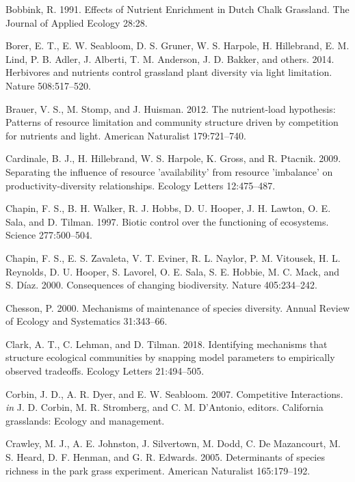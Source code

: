 \documentclass[twoside,12pt,final]{ucthesis-CA2012}
\begin{document}
\begin{ucmainmatter}
\leavevmode\hypertarget{ref-Bobbink1991}{}%
Bobbink, R. 1991. Effects of Nutrient Enrichment in Dutch Chalk Grassland. The Journal of Applied Ecology 28:28.

\leavevmode\hypertarget{ref-Borer2014a}{}%
Borer, E. T., E. W. Seabloom, D. S. Gruner, W. S. Harpole, H. Hillebrand, E. M. Lind, P. B. Adler, J. Alberti, T. M. Anderson, J. D. Bakker, and others. 2014. Herbivores and nutrients control grassland plant diversity via light limitation. Nature 508:517--520.

\leavevmode\hypertarget{ref-Brauer2012}{}%
Brauer, V. S., M. Stomp, and J. Huisman. 2012. The nutrient-load hypothesis: Patterns of resource limitation and community structure driven by competition for nutrients and light. American Naturalist 179:721--740.

\leavevmode\hypertarget{ref-Cardinale2009}{}%
Cardinale, B. J., H. Hillebrand, W. S. Harpole, K. Gross, and R. Ptacnik. 2009. Separating the influence of resource 'availability' from resource 'imbalance' on productivity-diversity relationships. Ecology Letters 12:475--487.

\leavevmode\hypertarget{ref-Chapin1997}{}%
Chapin, F. S., B. H. Walker, R. J. Hobbs, D. U. Hooper, J. H. Lawton, O. E. Sala, and D. Tilman. 1997. Biotic control over the functioning of ecosystems. Science 277:500--504.

\leavevmode\hypertarget{ref-Chapin2000}{}%
Chapin, F. S., E. S. Zavaleta, V. T. Eviner, R. L. Naylor, P. M. Vitousek, H. L. Reynolds, D. U. Hooper, S. Lavorel, O. E. Sala, S. E. Hobbie, M. C. Mack, and S. Díaz. 2000. Consequences of changing biodiversity. Nature 405:234--242.

\leavevmode\hypertarget{ref-Chesson2000}{}%
Chesson, P. 2000. Mechanisms of maintenance of species diversity. Annual Review of Ecology and Systematics 31:343--66.

\leavevmode\hypertarget{ref-Clark2018}{}%
Clark, A. T., C. Lehman, and D. Tilman. 2018. Identifying mechanisms that structure ecological communities by snapping model parameters to empirically observed tradeoffs. Ecology Letters 21:494--505.

\leavevmode\hypertarget{ref-Corbin2007}{}%
Corbin, J. D., A. R. Dyer, and E. W. Seabloom. 2007. Competitive Interactions. \emph{in} J. D. Corbin, M. R. Stromberg, and C. M. D'Antonio, editors. California grasslands: Ecology and management.

\leavevmode\hypertarget{ref-Crawley2005}{}%
Crawley, M. J., A. E. Johnston, J. Silvertown, M. Dodd, C. De Mazancourt, M. S. Heard, D. F. Henman, and G. R. Edwards. 2005. Determinants of species richness in the park grass experiment. American Naturalist 165:179--192.


\end{ucmainmatter}
\end{document}
